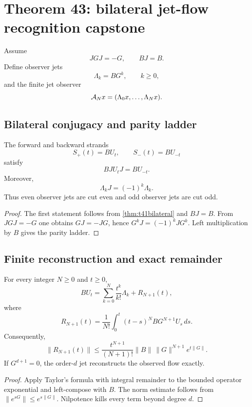 \section{Theorem 43: bilateral jet-flow recognition capstone}

Assume
\[
 JGJ=-G,
 \qquad BJ=B.
\]
Define observer jets
\[
 \Lambda_k=BG^k,
 \qquad k\ge0,
\]
and the finite jet observer
\[
 \mathcal A_Nx=(\Lambda_0x,\ldots,\Lambda_Nx).
\]

\subsection{Bilateral conjugacy and parity ladder}

\begin{theorem}
The forward and backward strands
\[
 S_+(t)=BU_t,
 \qquad
 S_-(t)=BU_{-t}
\]
satisfy
\[
 BJU_tJ=BU_{-t}.
\]
Moreover,
\[
 \Lambda_kJ=(-1)^k\Lambda_k.
\]
Thus even observer jets are cut even and odd observer jets are cut odd.
\end{theorem}

\begin{proof}
The first statement follows from \cref{thm:t41bilateral} and $BJ=B$. From $JGJ=-G$ one obtains $GJ=-JG$, hence $G^kJ=(-1)^kJG^k$. Left multiplication by $B$ gives the parity ladder.
\end{proof}

\subsection{Finite reconstruction and exact remainder}

\begin{theorem}\label{thm:t43remainder}
For every integer $N\ge0$ and $t\ge0$,
\[
 BU_t=\sum_{k=0}^N\frac{t^k}{k!}\Lambda_k+R_{N+1}(t),
\]
where
\[
 R_{N+1}(t)=\frac1{N!}\int_0^t(t-s)^NBG^{N+1}U_s\,ds.
\]
Consequently,
\[
 \|R_{N+1}(t)\|
 \le\frac{t^{N+1}}{(N+1)!}\|B\|\,\|G\|^{N+1}e^{t\|G\|}.
\]
If $G^{d+1}=0$, the order-$d$ jet reconstructs the observed flow exactly.
\end{theorem}

\begin{proof}
Apply Taylor's formula with integral remainder to the bounded operator exponential and left-compose with $B$. The norm estimate follows from $\|e^{sG}\|\le e^{s\|G\|}$. Nilpotence kills every term beyond degree $d$.
\end{proof}

